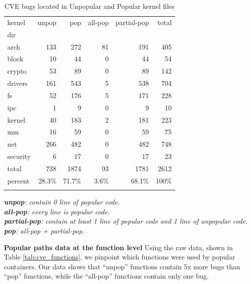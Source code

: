 \begin{table}
\small
\caption{CVE bugs located in Unpopular and Popular kernel files}
\label{tab:cve_files}
\begin{tabular}{l|r|r|r|r|r}
 kernel & unpop & pop & all-pop & partial-pop & total \\
 dir & \color{red}{(CVEs)} & \color{red}{(CVEs)} & \color{red}{(CVEs)} & \color{red}{(CVEs)} & \\
 \hline
 arch & 133\color{red}{(3)} & 272\color{red}{(1)} & 81 & 191\color{red}{(1)} & 405 \\
 \hline
 block & 10 & 44 & 0 & 44 & 54 \\
 \hline
 crypto & 53\color{red}{(1)} & 89\color{red}{(2)} & 0 & 89\color{red}{(2)} & 142 \\
 \hline
 drivers & 161\color{red}{(11)} & 543\color{red}{(3)} & 5 & 538\color{red}{(3)} & 704 \\
 \hline
 fs & 52\color{red}{(6)} & 176\color{red}{(2)} & 5 & 171\color{red}{(2)} & 228 \\
 \hline
 ipc & 1 & 9 & 0 & 9 & 10 \\
 \hline
 kernel & 40\color{red}{(2)} & 183 & 2 & 181 & 223 \\
 \hline
 mm & 16\color{red}{(1)} & 59\color{red}{(4)} & 0 & 59\color{red}{(4)} & 75 \\
 \hline
 net & 266\color{red}{(5)} & 482\color{red}{(3)} & 0 & 482\color{red}{(3)} & 748 \\
 \hline
 security & 6 & 17 & 0 & 17 & 23 \\
 \hline
 total & 738\color{red}{(29)} & 1874\color{red}{(15)} & 93 & 1781\color{red}{(15)} & 2612 \\
 \hline 
 percent & 28.3\% & 71.7\% & 3.6\% & 68.1\% & 100\% \\
 & \color{red}{(66\%)} & \color{red}{(34\%)} & \color{red}{(0\%)} & \color{red}{(34\%)} &
\end{tabular}
\textit{\textbf{unpop}: contain 0 line of popular code.} \\
\textit{\textbf{all-pop}: every line is popular code.} \\
\textit{\textbf{partial-pop}: contain at least 1 line of popular code and 1 line of unpopular code.} \\
\textit{\textbf{pop}: all-pop + partial-pop.}
\end{table}

\textbf{Popular paths data at the function level}
\newline
Using the raw data, shown in Table \ref{tab:cve_functions}, we pinpoint which functions were used by popular containers. 
Our data shows that ``unpop'' functions contain 5x more bugs than ``pop'' functions, while the ``all-pop'' functions contain only one bug. 

